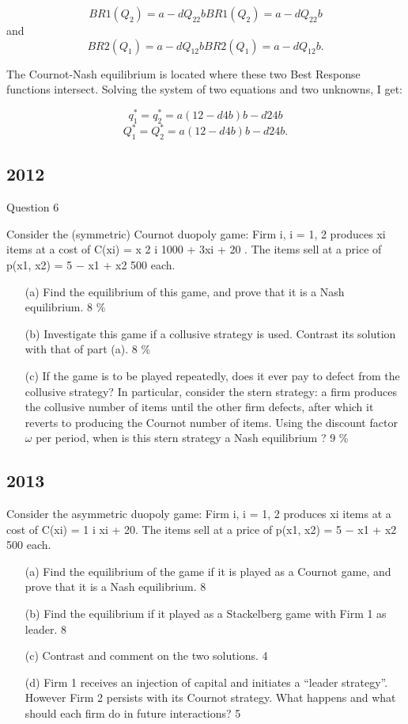 \documentclass[]{report}
\begin{document}
\[BR1(Q_2)=a−dQ_22bBR1(Q_2)=a−dQ_22b\] and 
\[BR2(Q_1)=a−dQ_12bBR2(Q_1)=a−dQ_12b.\]

The Cournot-Nash equilibrium is located where these two Best Response functions intersect. Solving the system of two equations and two unknowns, I get:

\[q^{\ast}_{1}=q^{\ast}_{2}=a(12−d4b)b−d24b\]
\[Q^{\ast}_{1}=Q^{\ast}_{2}=a(12−d4b)b−d24b.\]

\newpage
\subsection{2012}
Question 6 

Consider the (symmetric) Cournot duopoly game: Firm i, i = 1, 2 produces
xi
items at a cost of
C(xi) = x
2
i
1000 + 3xi + 20
. The items sell at a price of
p(x1, x2) = 5 −
x1 + x2
500
each.
\begin{itemize}
\item[(a)] Find the equilibrium of this game, and prove that it is a Nash equilibrium.
8 \%
\item[(b)] Investigate this game if a collusive strategy is used. Contrast its solution
with that of part (a). 8 \%
\item[(c)] If the game is to be played repeatedly, does it ever pay to defect from
the collusive strategy? In particular, consider the stern strategy: a firm
produces the collusive number of items until the other firm defects,
after which it reverts to producing the Cournot number of items. Using
the discount factor $\omega$ per period, when is this stern strategy a Nash
equilibrium ? 9 \%
\end{itemize}
\subsection{2013}
Consider the asymmetric duopoly game: Firm i, i = 1, 2 produces xi
items
at a cost of
C(xi) = 1
i
xi + 20.
The items sell at a price of
p(x1, x2) = 5 −
x1 + x2
500
each.

\begin{itemize}
\item[(a)] Find the equilibrium of the game if it is played as a Cournot game,
and prove that it is a Nash equilibrium. 8
\item[(b)] Find the equilibrium if it played as a Stackelberg game with Firm 1 as
leader. 8
\item[(c)] Contrast and comment on the two solutions. 4
\item[(d)] Firm 1 receives an injection of capital and initiates a “leader strategy”.
However Firm 2 persists with its Cournot strategy. What happens and
what should each firm do in future interactions? 5
\end{itemize}
\end{document}
